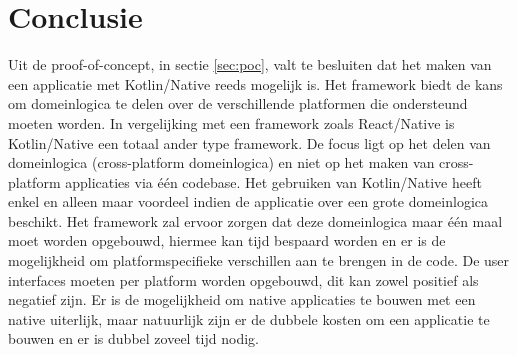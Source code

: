 
\chapter{Conclusie}
\label{ch:conclusie}


Uit de proof-of-concept, in sectie \ref{sec:poc}, valt te besluiten dat het maken van een applicatie met Kotlin/Native reeds mogelijk is. Het framework biedt de kans om domeinlogica te delen over de verschillende platformen die ondersteund moeten worden. In vergelijking met een framework zoals React/Native is Kotlin/Native een totaal ander type framework. De focus ligt op het delen van domeinlogica (cross-platform domeinlogica) en niet op het maken van cross-platform applicaties via één codebase. Het gebruiken van Kotlin/Native heeft enkel en alleen maar voordeel indien de applicatie over een grote domeinlogica beschikt. Het framework zal ervoor zorgen dat deze domeinlogica maar één maal moet worden opgebouwd, hiermee kan tijd bespaard worden en er is de mogelijkheid om platformspecifieke verschillen aan te brengen in de code. De user interfaces moeten per platform worden opgebouwd, dit kan zowel positief als negatief zijn. Er is de mogelijkheid om native applicaties te bouwen met een native uiterlijk, maar natuurlijk zijn er de dubbele kosten om een applicatie te bouwen en er is dubbel zoveel tijd nodig.

